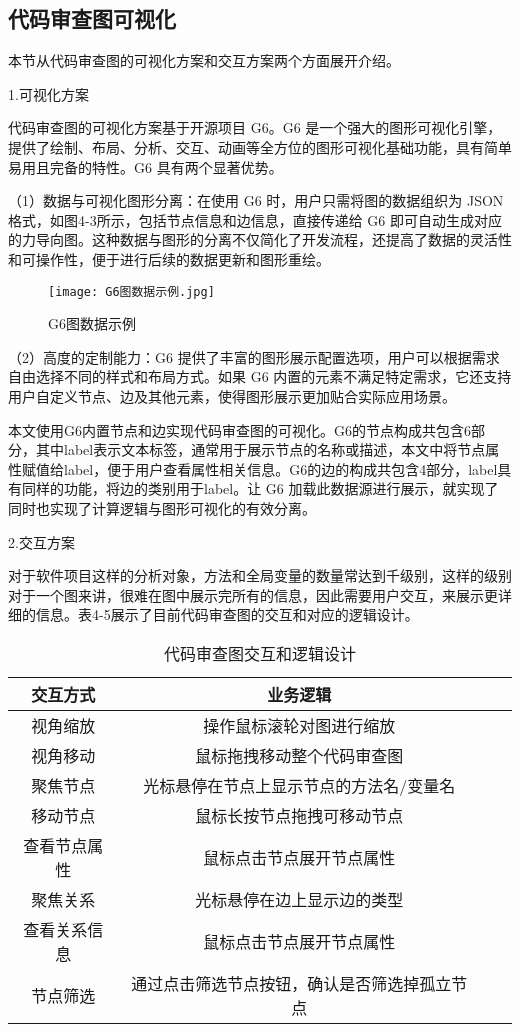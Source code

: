 \subsection{代码审查图可视化}

本节从代码审查图的可视化方案和交互方案两个方面展开介绍。

1.可视化方案 

代码审查图的可视化方案基于开源项目 G6。G6 是一个强大的图形可视化引擎，提供了绘制、布局、分析、交互、动画等全方位的图形可视化基础功能，具有简单易用且完备的特性。G6 具有两个显著优势。

（1）数据与可视化图形分离：在使用 G6 时，用户只需将图的数据组织为 JSON 格式，如图4-3所示，包括节点信息和边信息，直接传递给 G6 即可自动生成对应的力导向图。这种数据与图形的分离不仅简化了开发流程，还提高了数据的灵活性和可操作性，便于进行后续的数据更新和图形重绘。

\begin{figure}[h]
\centering
\texttt{[image: G6图数据示例.jpg]}
\caption{G6图数据示例}
\end{figure}

（2）高度的定制能力：G6 提供了丰富的图形展示配置选项，用户可以根据需求自由选择不同的样式和布局方式。如果 G6 内置的元素不满足特定需求，它还支持用户自定义节点、边及其他元素，使得图形展示更加贴合实际应用场景。

本文使用G6内置节点和边实现代码审查图的可视化。G6的节点构成共包含6部分，其中label表示文本标签，通常用于展示节点的名称或描述，本文中将节点属性赋值给label，便于用户查看属性相关信息。G6的边的构成共包含4部分，label具有同样的功能，将边的类别用于label。让 G6 加载此数据源进行展示，就实现了同时也实现了计算逻辑与图形可视化的有效分离。


2.交互方案

对于软件项目这样的分析对象，方法和全局变量的数量常达到千级别，这样的级别对于一个图来讲，很难在图中展示完所有的信息，因此需要用户交互，来展示更详细的信息。表4-5展示了目前代码审查图的交互和对应的逻辑设计。

\clearpage




\begin{table}[htbp]
\caption{代码审查图交互和逻辑设计}
\vspace{0.5em}\centering\wuhao
\begin{tabular}{cccc}
\toprule
交互方式 & 业务逻辑 \\
\midrule
视角缩放 & 操作鼠标滚轮对图进行缩放  \\
视角移动 & 鼠标拖拽移动整个代码审查图   \\
聚焦节点 & 光标悬停在节点上显示节点的方法名/变量名  \\
移动节点 & 鼠标长按节点拖拽可移动节点 \\
查看节点属性 & 鼠标点击节点展开节点属性  \\
聚焦关系 & 光标悬停在边上显示边的类型  \\
查看关系信息 & 鼠标点击节点展开节点属性  \\
节点筛选 & 通过点击筛选节点按钮，确认是否筛选掉孤立节点 \\
\bottomrule
\end{tabular}
\end{table}



